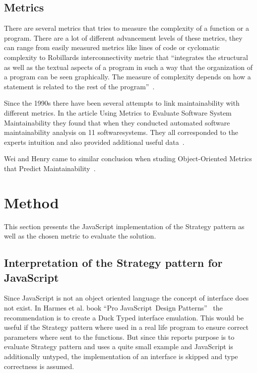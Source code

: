 \documentclass[conference, a4paper]{IEEEtran}
\begin{document}
\subsection{Metrics}
There are several metrics that tries to measure the complexity of a function or a program. There are a lot of different advancement levels of these metrics, they can range from easily measured metrics like lines of code or cyclomatic complexity to Robillards interconnectivity metric that ``integrates the structural as well as the textual aspects of a program in such a way that the organization of a program can be seen graphically. The measure of complexity depends on how a statement is related to the rest of the program''~\cite{bibitem:Robillard}.

Since the 1990s there have been several attempts to link maintainability with different metrics. In the article Using Metrics to Evaluate Software System Maintainability they found that when they conducted automated software maintainability analysis on 11 softwaresystems. They all corresponded to the experts intuition and also provided additional useful data~\cite{bibitem:MetricsToEvaluate}.

Wei and Henry came to similar conclusion when studing Object-Oriented Metrics that Predict Maintainability~\cite{bibitem:WeiHenry}.

\section{Method}
This section presents the JavaScript implementation of the Strategy pattern as well as the chosen metric to evaluate the solution.

\subsection{Interpretation of the Strategy pattern for JavaScript}
Since JavaScript is not an object oriented language the concept of interface does not exist. In Harmes et al. book ``Pro JavaScript\texttrademark~Design Patterns''~\cite{bibitem:DiazHarmes} the recommendation is to create a Duck Typed interface emulation. This would be useful if the Strategy pattern where used in a real life program to ensure correct parameters where sent to the functions. But since this reports purpose is to evaluate Strategy pattern and uses a quite small example and JavaScript is additionally untyped, the implementation of an interface is skipped and type correctness is assumed.
\end{document}
